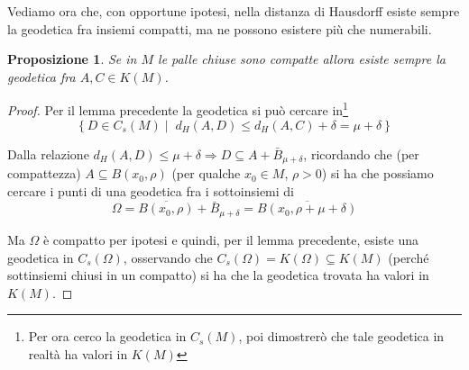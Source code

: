 \documentclass[a4paper,10pt]{article}
\newcounter{counter1}
\theoremstyle{plain}
\newtheorem{mypro}[counter1]{Proposizione}
\theoremstyle{definition}
\theoremstyle{remark}
\newcommand{\obar}[1]{\overline{#1}}
\newcommand{\set}[1]{\left\{#1\right\}}
\begin{document}
Vediamo ora che, con opportune ipotesi, nella distanza di Hausdorff
esiste sempre la geodetica fra insiemi compatti, ma ne possono
esistere più che numerabili.

\begin{mypro}
  Se in $M$ le palle chiuse sono compatte allora esiste sempre la
  geodetica fra $A,C \in K(M)$.
\end{mypro}
\begin{proof}
  Per il lemma precedente la geodetica si può cercare in\footnote{Per
    ora cerco la geodetica in $C_s(M)$, poi dimostrerò che tale
    geodetica in realtà ha valori in $K(M)$}
  \[ \set{D \in C_s(M) \mid \; d_H(A,D) \le d_H(A,C) + \delta= \mu +
    \delta } \]

  Dalla relazione $d_H(A,D) \le \mu + \delta \Rightarrow D \subseteq A
  + \bar B _{\mu + \delta}$, ricordando che (per compattezza) $A \subseteq
  B(x_0,\rho)$ (per qualche $x_0 \in M$, $\rho >0$) si ha che possiamo
  cercare i punti di una geodetica fra i sottoinsiemi di
  \[ \Omega = \obar{B(x_0,\rho)} + \bar B _{\mu + \delta} = \obar{ B
    (x_0, \rho + \mu + \delta) } \]

  Ma $\Omega$ è compatto per ipotesi e quindi, per il lemma
  precedente, esiste una geodetica in $C_s(\Omega)$, osservando che
  $C_s(\Omega) = K(\Omega) \subseteq K(M)$ (perché sottinsiemi chiusi
  in un compatto) si ha che la geodetica trovata ha valori in $K(M)$.
\end{proof}
\end{document}
